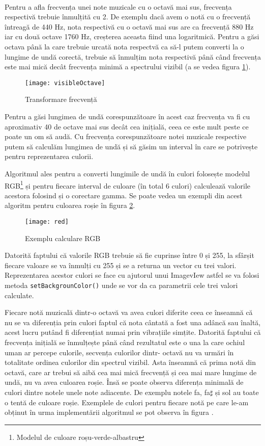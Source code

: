 \documentclass[../IoMusT.tex]{subfiles}
\begin{document}
\\
\par Pentru a afla frecvența unei note muzicale cu o octavă mai sus, frecvența respectivă trebuie înmulțită cu 2. De exemplu dacă avem o notă cu o frecvență întreagă de 440 Hz, nota respectivă cu o octavă mai sus are ca frecvență 880 Hz iar cu două octave 1760 Hz, creșterea aceasta fiind una logaritmică. Pentru a găsi octava până la care trebuie urcată nota respectvă ca să-l putem converti la o lungime de undă corectă, trebuie să înmulțim nota respectivă până când frecvența este mai mică decât frecvența minimă a spectrului vizibil (a se vedea figura \ref{fig:visibleOctave}).
\begin{figure}[h]
\centering
\texttt{[image: visibleOctave]}
\caption{Transformare frecvență}
\label{fig:visibleOctave}
\end{figure} 
Pentru a găsi lungimea de undă corespunzătoare în acest caz frecvența va fi cu aproximativ 40 de octave mai sus decât cea inițială, ceea ce este mult peste ce poate un om să audă. Cu frecvența corespunzătoare notei muzicale respective putem să calculăm lungimea de undă și să găsim un interval în care se potrivește pentru reprezentarea culorii.
\\
\par Algoritmul ales pentru a converti lungimile de undă în culori folosește modelul RGB\footnote{Modelul de culoare roșu-verde-albastru} și pentru fiecare interval de culoare (în total 6 culori) calculează valorile acestora folosind și o corectare gamma. Se poate vedea un exempli din acest algoritm pentru culoarea roșie în figura \ref{fig:red}.
\begin{figure}[h]
\centering
\texttt{[image: red]}
\caption{Exemplu calculare RGB}
\label{fig:red}
\end{figure} 
Datorită faptului că valorile RGB trebuie să fie cuprinse între 0 și 255, la sfârșit fiecare valoare se va înmulți cu 255 și se a returna un vector cu trei valori. Reprezentarea acestor culori se face cu ajutorul unui ImagevIew astfel se va folosi metoda \verb|setBackgrounColor()| unde se vor da ca parametrii cele trei valori calculate. 
\\
\par Fiecare notă muzicală dintr-o octavă va avea culori diferite ceea ce înseamnă că nu se va diferenția prin culori faptul că nota cântată a fost una adâncă sau înaltă, acest lucru putând fi diferențiat numai prin vibrațiile simțite. Datorită faptului că frecvența inițială se înmulțește până când rezultatul este o una la care ochiul uman ar percepe culorile, secvența culorilor dintr- octavă nu va urmări în totalitate ordinea culorilor din spectrul vizibil. Asta înseamnă că prima notă din octavă, care ar trebui să aibă cea mai mică frecvență și cea mai mare lungime de undă, nu va avea culoarea roșie. Însă se poate observa diferența minimală de culori dintre notele unele note adiacente. De exemplu notele fa, fa$\sharp$ și sol au toate o tentă de culoare roșie. Exemplele de culori pentru fiecare notă pe care le-am obținut în urma implementării algoritmul se pot observa în figura .
\end{document}
